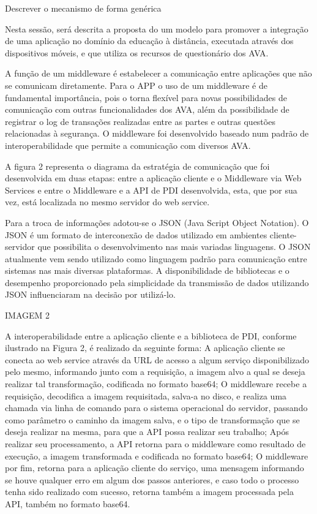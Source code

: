 \documentclass[12pt]{article}
\begin{document}
Descrever o mecanismo de forma genérica

Nesta sessão, será descrita a proposta do um modelo para promover a integração
de uma aplicação no domínio da educação à distância, executada através dos
dispositivos móveis, e que utiliza os recursos de questionário dos AVA.

A função de um middleware é estabelecer a comunicação entre aplicações que
não se comunicam diretamente. Para o APP o uso de um middleware é de fundamental
importância, pois o torna flexível para novas possibilidades de comunicação com outras
funcionalidades dos AVA, além da possibilidade de registrar o log de transações
realizadas entre as partes e outras questões relacionadas à segurança. O middleware foi 
desenvolvido baseado num padrão de interoperabilidade que permite a comunicação
com diversos AVA. 

A figura 2 representa o diagrama da estratégia de comunicação que
foi desenvolvida em duas etapas: entre a aplicação cliente e o Middleware via Web Services e entre
o Middleware e a API de PDI desenvolvida, esta, que por sua vez, está localizada no mesmo servidor do web service.

Para a troca de informações adotou-se o JSON (Java Script Object Notation). O
JSON é um formato de interconexão de dados utilizado em ambientes cliente-servidor
que possibilita o desenvolvimento nas mais variadas linguagens. O JSON atualmente
vem sendo utilizado como linguagem padrão para comunicação entre sistemas nas mais
diversas plataformas. A disponibilidade de bibliotecas e o desempenho proporcionado
pela simplicidade da transmissão de dados utilizando JSON influenciaram na decisão
por utilizá-lo.


IMAGEM 2

A interoperabilidade entre a aplicação cliente e a biblioteca de PDI, conforme ilustrado na Figura 2, é
realizado da seguinte forma:
A aplicação cliente se conecta ao web service através da URL de acesso a algum serviço disponibilizado pelo mesmo, informando junto com a requisição, a imagem alvo a qual se deseja realizar tal transformação, codificada no formato base64;
O middleware recebe a requisição, decodifica a imagem requisitada, salva-a no disco, e realiza uma chamada via linha de comando para o sistema operacional do servidor, passando como parâmetro o caminho da imagem salva, e o tipo de transformação que se deseja realizar na mesma, para que a API possa realizar seu trabalho;
Após realizar seu processamento, a API retorna para o middleware como resultado de execução, a imagem transformada e codificada no formato base64;
O middleware por fim, retorna para a aplicação cliente do serviço, uma mensagem informando se houve qualquer erro em algum dos passos anteriores, e caso todo o processo tenha sido realizado com sucesso, retorna também a imagem processada pela API, também no formato base64.
\end{document}
